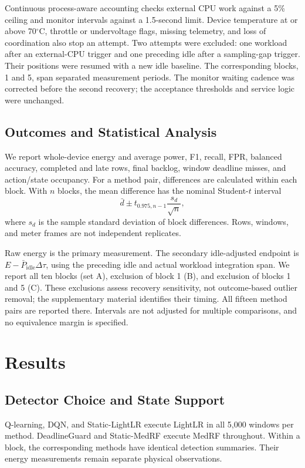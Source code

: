 \documentclass[journal]{IEEEtran}
\begin{document}
Continuous process-aware accounting checks external CPU work against a 5\% ceiling and monitor intervals against a 1.5-second limit. Device temperature at or above 70$^\circ$C, throttle or undervoltage flags, missing telemetry, and loss of coordination also stop an attempt. Two attempts were excluded: one workload after an external-CPU trigger and one preceding idle after a sampling-gap trigger. Their positions were resumed with a new idle baseline. The corresponding blocks, 1 and 5, span separated measurement periods. The monitor waiting cadence was corrected before the second recovery; the acceptance thresholds and service logic were unchanged.

\subsection{Outcomes and Statistical Analysis}
We report whole-device energy and average power, F1, recall, FPR, balanced accuracy, completed and late rows, final backlog, window deadline misses, and action/state occupancy. For a method pair, differences are calculated within each block. With $n$ blocks, the mean difference has the nominal Student-$t$ interval
\begin{equation}\label{eq:ci}
\bar d\pm t_{0.975,n-1}\frac{s_d}{\sqrt n},
\end{equation}
where $s_d$ is the sample standard deviation of block differences. Rows, windows, and meter frames are not independent replicates.

Raw energy is the primary measurement. The secondary idle-adjusted endpoint is $E-\bar P_{\mathrm{idle}}\Delta\tau$, using the preceding idle and actual workload integration span. We report all ten blocks (set A), exclusion of block 1 (B), and exclusion of blocks 1 and 5 (C). These exclusions assess recovery sensitivity, not outcome-based outlier removal; the supplementary material identifies their timing. All fifteen method pairs are reported there. Intervals are not adjusted for multiple comparisons, and no equivalence margin is specified.

\section{Results}\label{sec:results}

\subsection{Detector Choice and State Support}
Q-learning, DQN, and Static-LightLR execute LightLR in all 5,000 windows per method. DeadlineGuard and Static-MedRF execute MedRF throughout. Within a block, the corresponding methods have identical detection summaries. Their energy measurements remain separate physical observations.
\end{document}
